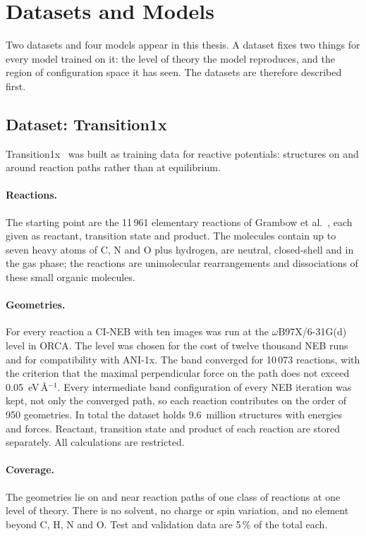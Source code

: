 \section{Datasets and Models}
\label{sec:background-datasets}

Two datasets and four models appear in this thesis. A dataset fixes two
things for every model trained on it: the level of theory the model
reproduces, and the region of configuration space it has seen. The
datasets are therefore described first.

\subsection{Dataset: Transition1x}
\label{sec:dataset-t1x}

Transition1x~\cite{schreiner2022} was built as training data for reactive
potentials: structures on and around reaction paths rather than at
equilibrium.

\paragraph{Reactions.} The starting point are the 11\,961 elementary
reactions of Grambow et al.~\cite{grambow2020}, each given as reactant,
transition state and product. The molecules contain up to seven heavy
atoms of C, N and O plus hydrogen, are neutral, closed-shell and in the
gas phase; the reactions are unimolecular rearrangements and
dissociations of these small organic molecules.

\paragraph{Geometries.} For every reaction a CI-NEB with ten images was
run at the \mbox{$\omega$B97X/6-31G(d)} level in ORCA. The level was
chosen for the cost of twelve thousand NEB runs and for compatibility
with ANI-1x. The band converged for
10\,073 reactions, with the criterion that the maximal perpendicular force
on the path does not exceed 0.05~eV\,\AA$^{-1}$. Every intermediate band
configuration of every NEB iteration was kept, not only the converged
path, so each reaction contributes on the order of 950 geometries. In
total the dataset holds 9.6~million structures with energies and forces.
Reactant, transition state and product of each reaction are stored
separately. All calculations are restricted.

\paragraph{Coverage.} The geometries lie on and near reaction paths of
one class of reactions at one level of theory. There is no solvent, no
charge or spin variation, and no element beyond C, H, N and O. Test and
validation data are 5\,\% of the total each.

